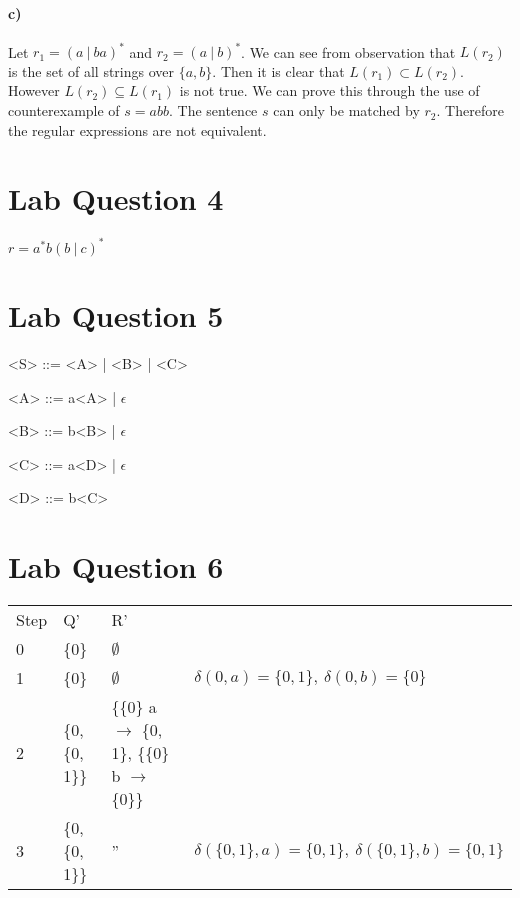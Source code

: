 \documentclass[12pt, letter]{article}
\begin{document}
	\paragraph{c)}
	Let $r_1 = (a\ |\ ba)^*$ and $r_2 = (a\ |\ b)^*$. We can see from observation that $L(r_2)$ is the set of all strings over $\{a, b\}$. Then it is clear that $L(r_1) \subset L(r_2)$. However $L(r_2) \subseteq L(r_1)$ is not true. We can prove this through the use of counterexample of $s = abb$. The sentence $s$ can only be matched by $r_2$. Therefore the regular expressions are not equivalent.
	
	\section*{Lab Question 4}
	$r = a^*b(b\ \vert\ c)^*$
	\section*{Lab Question 5}
	\begin{grammar}
	<S> ::= <A> | <B> | <C>
	
	<A> ::= a<A> | $\epsilon$
	
	<B> ::= b<B> | $\epsilon$
	
	<C> ::= a<D> | $\epsilon$
	
	<D> ::= b<C>
	\end{grammar}

	\section*{Lab Question 6}
	
	
	
	\begin{tabular}{ l l l l }
		Step & Q' & R' & \\
		0 & \{0\} & $\emptyset$ & \\  
		1 & \{0\} & $\emptyset$ & $\delta(0, a) = \{0, 1\},\ \delta(0, b) = \{0\}$ \\
		2 & \{0, \{0, 1\}\} & \{\{0\} a $\rightarrow$ \{0, 1\}, \{\{0\} b $\rightarrow$ \{0\}\} &\ \\
		3 & \{0, \{0, 1\}\} & '' & $\delta(\{0, 1\}, a) = \{0, 1\},\ \delta(\{0, 1\}, b) = \{0, 1\}$ \\
	\end{tabular}
\end{document}
